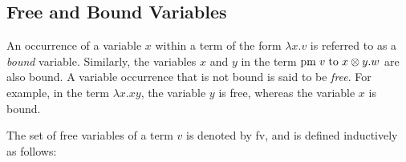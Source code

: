 \subsection{Free and Bound Variables}
An occurrence of a variable $x$ within a term of the form $\lambda x.v$ is referred to as a \emph{bound} variable.  Similarly, the variables $x$ and $y$ in the term $\text{pm} \hspace{3 pt} v \hspace{3 pt} \text{to} \hspace{3 pt} x \otimes y. w$ are also bound. A variable occurrence that is not bound is said to be \emph{free}. For example, in the term $\lambda x.xy$, the variable $y$ is free, whereas the variable $x$ is bound.  

The set of free variables of a term $v$ is denoted by \gls{fv}, and is defined inductively as follows:

\begin{comment}
\begin{equation*}
\begin{split}
FV(x) &= \{x\}, &  FV(*) &= \emptyset,  \\
FV(f(v_1, \ldots, v_n)), &= FV(v_1) \cup \ldots \cup FV(v_n)& FV(\lambda x: \mathbb{A}. v) &= FV(v) \backslash \{x\}, \\
FV(v w) &= FV(v) \cup FV(w), & FV(v \otimes w) &= FV(v) \cup FV(w), \\
FV(\text{pm} \hspace{3 pt} v \hspace{3 pt} \text{to} \hspace{3 pt} x \otimes y. w), &= FV(v) \cup (FV(w)  \backslash \{x,y\}) & FV(\text{dis}(v)) &= FV(v),\\
FV(v \text{ to } *.w) &= FV(v) \cup FV(w)  &  FV(\text{inl}_\typeB) &=  FV(v). \\
\end{split}
\end{equation*}
\end{comment}

